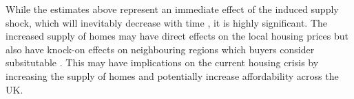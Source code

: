 While the estimates above represent an immediate effect of the induced supply shock, which will inevitably decrease with time \cite{fibich_dynamics_2005}, it is highly significant. The increased supply of homes may have direct effects on the local housing prices but also have knock-on effects on neighbouring regions which buyers consider subsitutable \cite{fingleton_housing_2019} . This may have implications on the current housing crisis by increasing the supply of homes and potentially increase affordability across the UK.